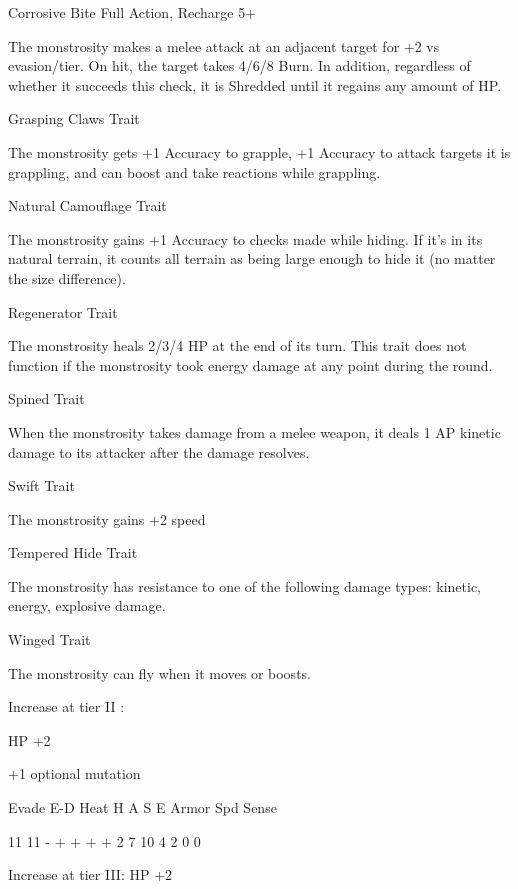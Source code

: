 Corrosive Bite  
Full Action, Recharge 5+
 
The monstrosity makes a melee attack at an adjacent target for +2 vs evasion/tier. On hit, the  
target takes 4/6/8 Burn. In addition, regardless of whether it succeeds this check, it is Shredded  
until it regains any amount of HP.
 

Grasping Claws  
Trait
 
The monstrosity gets +1 Accuracy to grapple, +1 Accuracy to attack targets it is grappling, and  
can boost and take reactions while grappling.
 

Natural Camouflage  
Trait
 
The monstrosity gains +1 Accuracy to checks made while hiding. If it’s in its natural terrain, it  
counts all terrain as being large enough to hide it (no matter the size difference).
 

Regenerator  
Trait
 
The monstrosity heals 2/3/4 HP at the end of its turn. This trait does not function if the  
monstrosity took energy damage at any point during the round.
 

Spined  
Trait
 
When the monstrosity takes damage from a melee weapon, it deals 1 AP kinetic damage to its  
attacker after the damage resolves.
 

Swift  
Trait
 
The monstrosity gains +2 speed
 

Tempered Hide  
Trait
 
The monstrosity has resistance to one of the following damage types: kinetic, energy, explosive  
damage.
 

                                                                                                                    


Winged  
Trait
 
The monstrosity can fly when it moves or boosts.
 

Increase at tier II :
 
HP +2
 
+1 optional mutation
 

         Evade    E-D     Heat    H   A   S    E   Armor     Spd       Sense 

         11       11      -       +   +   +    +   2         7         10 
                                  4   2   0    0 

Increase at tier III:  
HP +2
 
